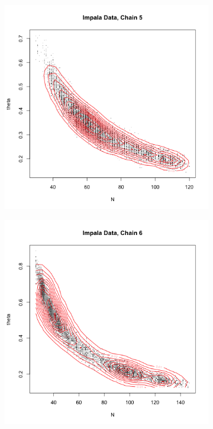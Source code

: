 \documentclass[10pt,psamsfonts]{amsart}
\theoremstyle{definition}
\theoremstyle{remark}
\numberwithin{equation}{section}
\begin{document}
\begin{figure}
\begin{subfigure}[b]{0.3\textwidth}
	\end{subfigure}
	\begin{subfigure}[b]{0.3\textwidth}
		\includegraphics[width=\textwidth]{wonlee_mcmc_impala_5.png}
	\end{subfigure}
	\begin{subfigure}[b]{0.3\textwidth}
		\includegraphics[width=\textwidth]{wonlee_mcmc_impala_6.png}

\end{subfigure}
\end{figure}
\end{document}
